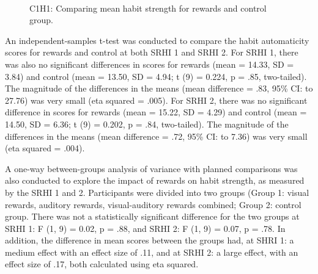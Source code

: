 \documentclass{scaffold/sigchi}
\begin{document}
\begin{figure}
  \centering
  \caption{C1H1: Comparing mean habit strength for rewards and control group.}~\label{fig:habit_4_item_survey1_v_survey2}
\end{figure}

An independent-samples t-test was conducted to compare the habit automaticity scores
for rewards and control at both SRHI 1 and SRHI 2. For SRHI 1, there was also no significant differences in scores for rewards (mean = 14.33, SD = 3.84) and control (mean = 13.50, SD = 4.94; t (9) = 0.224, p = .85,
two-tailed). The magnitude of the differences in the means (mean difference = .83,
95\% CI:  to 27.76) was very small (eta squared = .005). For SRHI 2, there was no significant difference in scores for rewards
(mean = 15.22, SD = 4.29) and control (mean = 14.50, SD = 6.36; t (9) = 0.202, p = .84,
two-tailed). The magnitude of the differences in the means (mean difference = .72,
95\% CI:  to 7.36) was very small (eta squared = .004).


A one-way between-groups analysis of variance with planned comparisons was also conducted to explore the impact of rewards on habit strength, as measured by the SRHI 1 and 2. Participants were divided into two groups (Group 1: visual rewards, auditory rewards, visual-auditory rewards combined; Group 2: control group. There was not a
statistically significant difference for the two groups at SRHI 1: F (1, 9) = 0.02, p = .88, and SRHI 2: F (1, 9) = 0.07, p = .78. In addition, the difference in mean scores between the groups had, at SHRI 1: a medium effect with an effect size of .11, and at SRHI 2: a large effect, with an effect size of .17, both calculated using eta squared.
\end{document}
